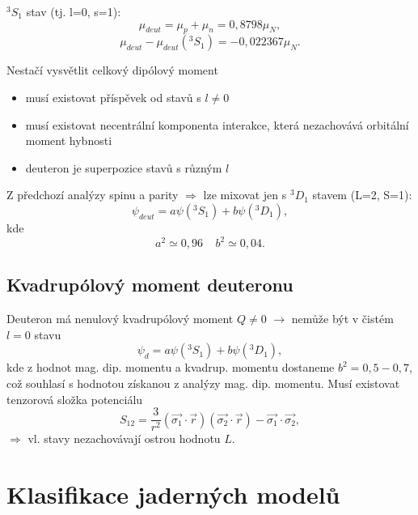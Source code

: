 \documentclass[../../main.tex]{subfiles}
\begin{document}
$^{3}S_1 $ stav (tj. l=0, s=1): 
\begin{equation}
\mu _{deut} = \mu_p + \mu _n = 0,8798 \mu _N,
\end{equation}
\begin{equation}
\mu _{deut} - \mu _{deut} (^{3} S_1) = - 0,022367 \mu _N.
\end{equation}
	
Nestačí vysvětlit celkový dipólový moment
\begin{itemize}
   \item musí existovat příspěvek od stavů s $l\neq 0$
   \item musí existovat necentrální komponenta interakce, která nezachovává orbitální moment hybnosti
   \item deuteron je superpozice stavů s různým $l$
 \end{itemize}  	
 
 Z předchozí analýzy spinu a parity $\Rightarrow$ lze mixovat jen s $^{3}D_1$ stavem (L=2, S=1):
 \begin{equation}
 \psi _{deut} = a \psi (^{3}S_1) + b \psi (^{3}D_1),
 \end{equation}	
 kde 
 \begin{equation}
 a^2 \simeq 0,96 ~~~~~ b^2 \simeq 0,04.
\end{equation}

\subsection{Kvadrupólový moment deuteronu}

Deuteron má nenulový kvadrupólový moment $Q \neq 0$ $\rightarrow$ nemůže být v čistém $l=0$ stavu
\begin{equation}
\psi _d = a \psi (^{3}S_1) + b \psi (^{3}D_1),
\end{equation}
kde z hodnot  mag. dip. momentu a kvadrup. momentu dostaneme $b^2 = 0,5 - 0,7$, což souhlasí s hodnotou získanou z analýzy mag. dip. momentu. Musí existovat tenzorová složka potenciálu
\begin{equation}
S_{12} = \dfrac{3}{r^2} (\vec{\sigma_1} \cdotp \vec{r})(\vec{\sigma_2} \cdotp \vec{r}) - \vec{\sigma_1} \cdotp \vec{\sigma_2},
\end{equation}
$\Rightarrow$ vl. stavy nezachovávají ostrou hodnotu $L$.

\section{Klasifikace jaderných modelů}
\end{document}
